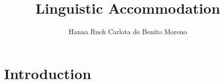 \documentclass[output=paper,
modfonts
]{langscibook}
\title{Linguistic Accommodation}
\author{%
 Hanna Ruch\affiliation{University of Zurich}\lastand 
 Carlota de Benito Moreno\affiliation{University of Zurich}
}
\begin{document}
\maketitle

\section{Introduction} \label{Section_Introduction}
% 
% 
% 
% 
% 
\end{document}
